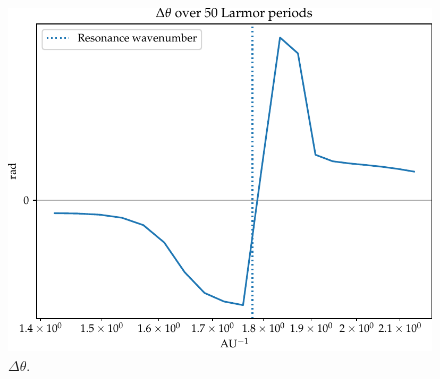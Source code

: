 \documentclass[main.tex]{subfiles}
\begin{document}
\begin{figure}[ht]
\centering
\includegraphics[width=\textwidth]{figures/final_point_variance}
\caption{\(\Delta \theta \).}
\label{fig:final_point_variance}
\end{figure}
\end{document}
